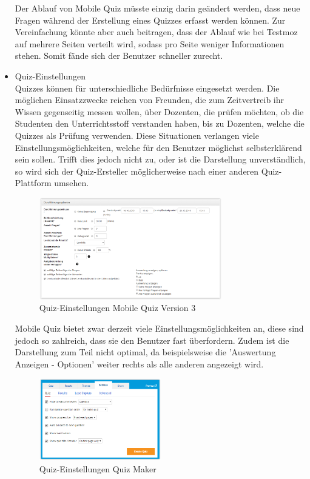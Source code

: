 \begin{itemize}
		Der Ablauf von Mobile Quiz müsste einzig darin geändert werden, dass neue Fragen während der Erstellung eines Quizzes erfasst werden können. Zur Vereinfachung könnte aber auch beitragen, dass der Ablauf wie bei Testmoz \cite{testmoz.com} auf mehrere Seiten verteilt wird, sodass pro Seite weniger Informationen stehen. Somit fände sich der Benutzer schneller zurecht.
		
		
		\newpage
		\item  Quiz-Einstellungen \\
		Quizzes können für unterschiedliche Bedürfnisse eingesetzt werden. Die möglichen Einsatzzwecke reichen von Freunden, die zum Zeitvertreib ihr Wissen gegenseitig messen wollen, über Dozenten, die prüfen möchten, ob die Studenten den Unterrichtsstoff verstanden haben, bis zu Dozenten, welche die Quizzes als Prüfung verwenden.
		Diese Situationen verlangen viele Einstellungsmöglichkeiten, welche für den Benutzer möglichst selbsterklärend sein sollen. Trifft dies jedoch nicht zu, oder ist die Darstellung unverständlich, so wird sich der Quiz-Ersteller möglicherweise nach einer anderen Quiz-Plattform umsehen.
		
		\begin{figure}[h]
			\centering
			\includegraphics[width=0.75\textwidth
			]{Images/MobileQuiz_Quiz-Settings.PNG}
			\caption{Quiz-Einstellungen Mobile Quiz Version 3}
		\end{figure}
		
		
		Mobile Quiz bietet zwar derzeit viele Einstellungsmöglichkeiten an, diese sind jedoch so zahlreich, dass sie den Benutzer fast überfordern. Zudem ist die Darstellung zum Teil nicht optimal, da beispielsweise die 'Auswertung Anzeigen - Optionen' weiter rechts als alle anderen angezeigt wird.
		
		\begin{figure}[h]
			\centering
			\includegraphics[width=0.5\textwidth
			]{Images/QuizMaker_Quiz-Settings.PNG}
			\caption{Quiz-Einstellungen Quiz Maker}
		\end{figure}
		

\end{itemize}
